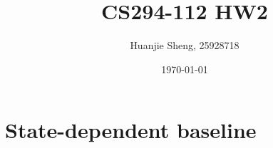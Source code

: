 \documentclass[12pt]{article}
\title{CS294-112 HW2\vspace{-2ex}}
\author{Huanjie Sheng, 25928718\vspace{-2ex}}
\date{\today \vspace{-2ex}}
\begin{document}
	
	\renewcommand{\thesubsection}{(\alph{subsection})}
	\renewcommand{\thesection}{Problem \arabic{section}.}
	\newcommand{\sectionbreak}{\clearpage}
	
	\section{State-dependent baseline}
\end{document}
